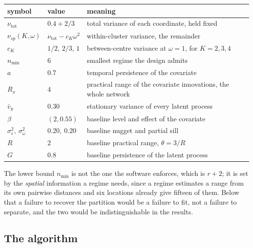 \documentclass[11pt]{article}
\begin{document}
\begin{center}
\begin{tabular}{lll}
\toprule
symbol & value & meaning \\
\midrule
$\nu_{\mathrm{tot}}$ & $0.4 + 2/3$ & total variance of each coordinate, held fixed \\
$\nu_{sp}(K,\omega)$ & $\nu_{\mathrm{tot}} - c_K \omega^2$ & within-cluster variance, the remainder \\
$c_K$        & $1/2,\,2/3,\,1$ & between-centre variance at $\omega=1$, for $K = 2, 3, 4$ \\
$n_{\min}$   & $6$          & smallest regime the design admits \\
$a$          & $0.7$        & temporal persistence of the covariate \\
$R_x$        & $4$          & practical range of the covariate innovations, the whole network \\
$\bar v_y$   & $0.30$       & stationary variance of every latent process \\
$\beta$      & $(2, 0.55)$  & baseline level and effect of the covariate \\
$\sigma^2_\epsilon,\ \sigma^2_\omega$ & $0.20,\ 0.20$ & baseline nugget and partial sill \\
$R$          & $2$          & baseline practical range, $\theta = 3/R$ \\
$G$          & $0.8$        & baseline persistence of the latent process \\
\bottomrule
\end{tabular}
\end{center}

The lower bound $n_{\min}$ is not the one the software enforces, which is $r+2$; it is set by the \emph{spatial} information a regime needs, since a regime estimates a range from its own pairwise distances and six locations already give fifteen of them. Below that a failure to recover the partition would be a failure to fit, not a failure to separate, and the two would be indistinguishable in the results.

\subsection{The algorithm}
\end{document}
